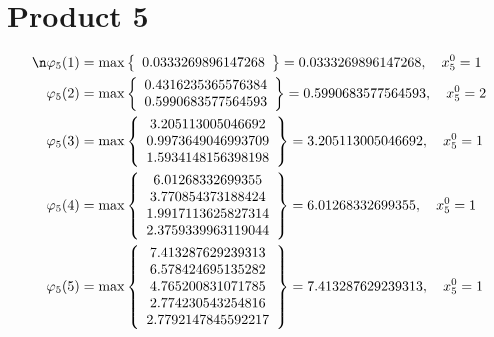 \documentclass{article}
\begin{document}
\section{Product 5}
\begin{align*}
\n  
  
\varphi_{5}(1) &= \max \left\{ \begin{array}{c}
0.0333269896147268
\end{array} \right\} = 0.0333269896147268, \quad x_{5}^0 = 1\\
  
  
  
  
\varphi_{5}(2) &= \max \left\{ \begin{array}{c}
0.4316235365576384 \\
 0.5990683577564593
\end{array} \right\} = 0.5990683577564593, \quad x_{5}^0 = 2\\
  
  
  
  
\varphi_{5}(3) &= \max \left\{ \begin{array}{c}
3.205113005046692 \\
 0.9973649046993709 \\
 1.5934148156398198
\end{array} \right\} = 3.205113005046692, \quad x_{5}^0 = 1\\
  
  
  
  
\varphi_{5}(4) &= \max \left\{ \begin{array}{c}
6.01268332699355 \\
 3.770854373188424 \\
 1.9917113625827314 \\
 2.3759339963119044
\end{array} \right\} = 6.01268332699355, \quad x_{5}^0 = 1\\
  
  
  
  
\varphi_{5}(5) &= \max \left\{ \begin{array}{c}
7.413287629239313 \\
 6.578424695135282 \\
 4.765200831071785 \\
 2.774230543254816 \\
 2.7792147845592217
\end{array} \right\} = 7.413287629239313, \quad x_{5}^0 = 1\\
  
  
  

\end{align*}
\end{document}
